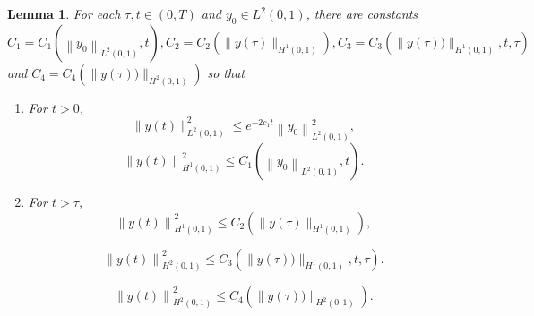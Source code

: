 \documentclass[review]{elsarticle}
\newtheorem{lemma}[theorem]{Lemma}
\numberwithin{equation}{section}
\begin{document}
\begin{lemma}\label{energy-estimatet}
For each $\tau,t \in\left(0, T\right)$ and $y_0\in L^2(0,1)$, there are constants $C_1=C_1\left(\left\|y_0\right\|_{L^2(0,1)}, t\right),C_2=C_2\left(\|y(\tau)\|_{H^1(0,1)}\right),C_3=C_3\left(\|y(\tau))\|_{H^1(0,1)},t,\tau\right)$ and $C_4=C_4\left(\|y(\tau))\|_{H^2(0,1)}\right)$ so that
\begin{enumerate}
    \item[(i)]For $t>0$,
    \begin{equation}
        \label{energy estimate1}
        \|y(t)\|^2_{L^2(0,1)} \leq e^{-2 c_1t}\left\|y_0\right\|^2_{L^2(0,1)},
    \end{equation}
    \begin{equation}
        \label{energy estimate3}
      \left\|y(t)\right\|^2_{H^1(0,1)} \le C_1\left(\left\|y_0\right\|_{L^2(0,1)}, t\right).
    \end{equation}

    \item[(ii)]For $t>\tau$,
    \begin{equation}
        \label{energy estimate4}
       \left\|y(t)\right\|^2_{H^1(0,1)} \le C_2\left(\|y(\tau)\|_{H^1(0,1)}\right),
    \end{equation}
   
    
    \begin{equation}
        \label{energy estimate8}
        \left\|y(t)\right\|^2_{H^2(0,1)} \le C_3\left(\|y(\tau))\|_{H^1(0,1)},t,\tau\right).
    \end{equation}
   
    \begin{equation}
        \label{energy estimate10}
      \left\|y(t)\right\|^2_{H^2(0,1)} \leq C_4\left(\|y(\tau))\|_{H^2(0,1)}\right).
    \end{equation}
\end{enumerate}
\end{lemma}
\end{document}
